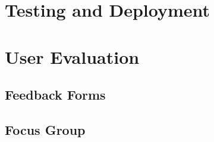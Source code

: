 \section{Testing and Deployment}
\section{User Evaluation}
\subsection{Feedback Forms}
\subsection{Focus Group}